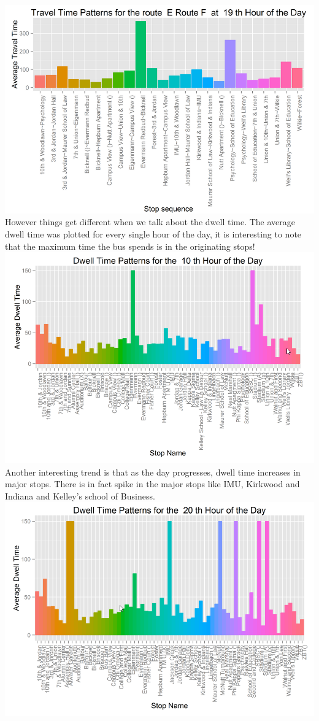\documentclass[12pt]{article}\usepackage[]{graphicx}\usepackage[]{color}
\begin{document}
\includegraphics[scale=0.4]{resources/ggplot3}\\[1cm] 
However things get different when we talk about the dwell time. The average dwell time was plotted for every single hour of the day, it is interesting to note that the maximum time the bus spends is in the originating stops! \\
\includegraphics[scale=0.4]{resources/ggplot4}\\[1cm] 
Another interesting trend is that as the day progresses, dwell time increases in major stops. There is in fact spike in the major stops like IMU, Kirkwood and Indiana and Kelley's school of Business. \\
\includegraphics[scale=0.4]{resources/ggplot5}\\[1cm] 
\end{document}
